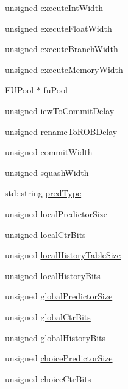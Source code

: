 \begin{DoxyCompactItemize}
\item 
unsigned \hyperlink{classSimpleParams_a9f29bf4b2a7e70be4eed68fe83df1e0a}{executeIntWidth}
\item 
unsigned \hyperlink{classSimpleParams_ae3d1c39f9a851b4bf743bd76548080b9}{executeFloatWidth}
\item 
unsigned \hyperlink{classSimpleParams_ae6c499bbea6a73213137abb74896a1cf}{executeBranchWidth}
\item 
unsigned \hyperlink{classSimpleParams_ac5313b85037f8a28b99f6e64f6923bf1}{executeMemoryWidth}
\item 
\hyperlink{classFUPool}{FUPool} $\ast$ \hyperlink{classSimpleParams_a480782fc1cfd21fd9748b26f2a08b97a}{fuPool}
\item 
unsigned \hyperlink{classSimpleParams_a6a56d774383a8dab324477445c75608c}{iewToCommitDelay}
\item 
unsigned \hyperlink{classSimpleParams_a0d3956c9a6bf20e2b0e1e96d251cf03c}{renameToROBDelay}
\item 
unsigned \hyperlink{classSimpleParams_aeab15260a0ccc0ea470bb74344b63d17}{commitWidth}
\item 
unsigned \hyperlink{classSimpleParams_a2bfc819c212cc4fda248fe12fbba68b8}{squashWidth}
\item 
std::string \hyperlink{classSimpleParams_a3fbe874c944e8c34b6ff01eb669d76b7}{predType}
\item 
unsigned \hyperlink{classSimpleParams_ad980634448337df2bf521bc96fd5653d}{localPredictorSize}
\item 
unsigned \hyperlink{classSimpleParams_a815998927bcd79afe7f787b90f9954f5}{localCtrBits}
\item 
unsigned \hyperlink{classSimpleParams_a71759b087accf553cc72b42bbd20dacd}{localHistoryTableSize}
\item 
unsigned \hyperlink{classSimpleParams_affb9008b5a92be8b47d319a4ecc28683}{localHistoryBits}
\item 
unsigned \hyperlink{classSimpleParams_ad3a4f2fc3c100e6baa69ece70da3cc07}{globalPredictorSize}
\item 
unsigned \hyperlink{classSimpleParams_a21c0cae328ca40466ae7e247bd62373f}{globalCtrBits}
\item 
unsigned \hyperlink{classSimpleParams_a64788f44637c4acaa30edab60e940f1e}{globalHistoryBits}
\item 
unsigned \hyperlink{classSimpleParams_aa71f36048f2ff08f22872c928bb15ad7}{choicePredictorSize}
\item 
unsigned \hyperlink{classSimpleParams_aee44accc1717e338f8b33ff113d62be2}{choiceCtrBits}

\end{DoxyCompactItemize}
